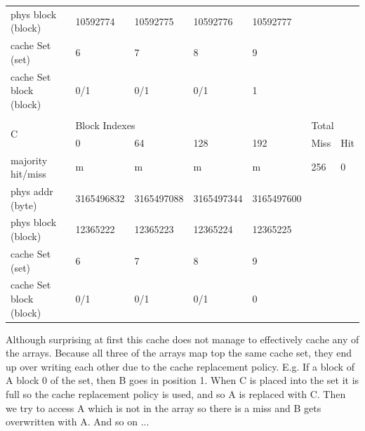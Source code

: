 \documentclass[12pt]{article}
\begin{document}
\begin{table}[H]
\begin{tabular}{lllllll}
\multicolumn{1}{l|}{phys block (block)}      & 10592774   & 10592775   & 10592776   & \multicolumn{1}{l|}{10592777}   &              &             \\
\multicolumn{1}{l|}{cache Set (set)}         & 6          & 7          & 8          & \multicolumn{1}{l|}{9}          &              &             \\
\multicolumn{1}{l|}{cache Set block (block)} & 0/1        & 0/1        & 0/1        & \multicolumn{1}{l|}{1}          &              &             \\
                                             &            &            &            &                                 &              &             \\
\multicolumn{1}{l|}{\multirow{2}{*}{C}}      & \multicolumn{4}{l|}{Block Indexes}                                     & \multicolumn{2}{l}{Total}  \\
\multicolumn{1}{l|}{}                        & 0          & 64         & 128        & \multicolumn{1}{l|}{192}        & Miss         & Hit         \\ \hline
\multicolumn{1}{l|}{majority hit/miss}       & m          & m          & m          & \multicolumn{1}{l|}{m}          & 256          & 0           \\
\multicolumn{1}{l|}{phys addr (byte)}        & 3165496832 & 3165497088 & 3165497344 & \multicolumn{1}{l|}{3165497600} &              &             \\
\multicolumn{1}{l|}{phys block (block)}      & 12365222   & 12365223   & 12365224   & \multicolumn{1}{l|}{12365225}   &              &             \\
\multicolumn{1}{l|}{cache Set (set)}         & 6          & 7          & 8          & \multicolumn{1}{l|}{9}          &              &             \\
\multicolumn{1}{l|}{cache Set block (block)} & 0/1        & 0/1        & 0/1        & \multicolumn{1}{l|}{0}          &              &            
\end{tabular}
\end{table}

			Although surprising at first this cache does not manage to effectively cache any of the arrays. Because all three of the arrays map top the same cache set, they end up over writing each other due to the cache replacement policy. E.g. If a block of A block 0 of the set, then B goes in position 1. When C is placed into the set it is full so the cache replacement policy is used, and so A is replaced with C. Then we try to access A which is not in the array so there is a miss and B gets overwritten with A. And so on ...
			
\end{document}
